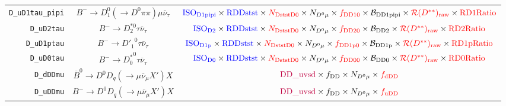 \begin{landscape}
\begin{table}
\begin{tabular}{r|c|c}
 \texttt{D\_uD1tau\_pipi} &       $B^- \rightarrow D_1^0 (\rightarrow D^0 \pi\pi) \mu \overline{\nu}_\tau$       &                        $\textcolor{blue}{\text{ISO}_\text{D1pipi}} \times \textcolor{blue}{\text{RDDstst}} \times \textcolor{red}{N_\text{DststD0}} \times N_{D^0 \mu} \times \textcolor{red}{f_\text{DD10}} \times \mathcal{B}_\text{DD1pipi} \times \textcolor{red}{\mathcal{R}(D^{**})_\text{raw}} \times \textcolor{red}{\text{RD1Ratio}}$                        \\
       \texttt{D\_uD2tau} &                 $B^- \rightarrow D_2^{*0} \tau \overline{\nu}_\tau$                  &                            $\textcolor{blue}{\text{ISO}_\text{D2}} \times \textcolor{blue}{\text{RDDstst}} \times \textcolor{red}{N_\text{DststD0}} \times N_{D^0 \mu} \times \textcolor{red}{f_\text{DD20}} \times \mathcal{B}_\text{DD2} \times \textcolor{red}{\mathcal{R}(D^{**})_\text{raw}} \times \textcolor{red}{\text{RD2Ratio}}$                            \\
      \texttt{D\_uD1ptau} &                 $B^- \rightarrow {D'_1}^0 \tau \overline{\nu}_\tau$                  &                          $\textcolor{blue}{\text{ISO}_\text{D1p}} \times \textcolor{blue}{\text{RDDstst}} \times \textcolor{red}{N_\text{DststD0}} \times N_{D^0 \mu} \times \textcolor{red}{f_\text{DD1p0}} \times \mathcal{B}_\text{DD1p} \times \textcolor{red}{\mathcal{R}(D^{**})_\text{raw}} \times \textcolor{red}{\text{RD1pRatio}}$                          \\
       \texttt{D\_uD0tau} &                 $B^- \rightarrow {D^*_0}^0 \tau \overline{\nu}_\tau$                 &                            $\textcolor{blue}{\text{ISO}_\text{D0}} \times \textcolor{blue}{\text{RDDstst}} \times \textcolor{red}{N_\text{DststD0}} \times N_{D^0 \mu} \times \textcolor{red}{f_\text{DD00}} \times \mathcal{B}_\text{DD0} \times \textcolor{red}{\mathcal{R}(D^{**})_\text{raw}} \times \textcolor{red}{\text{RD0Ratio}}$                            \\
        \texttt{D\_dDDmu} &    $\overline{B}^0 \rightarrow D^0 D_q (\rightarrow \mu \overline{\nu}_\mu X') X$    &                                                                                                                           $\textcolor{purple}{\text{DD\_uvsd}} \times f_\text{DD} \times N_{D^0 \mu} \times \textcolor{red}{f_\text{dDD}}$                                                                                                                            \\
        \texttt{D\_uDDmu} &         $B^- \rightarrow D^0 D_q (\rightarrow \mu \overline{\nu}_\mu X') X$          &                                                                                                                           $\textcolor{purple}{\text{DD\_uvsd}} \times f_\text{DD} \times N_{D^0 \mu} \times \textcolor{red}{f_\text{uDD}}$                                                                                                                            \\

\end{tabular}
\end{table}
\end{landscape}
